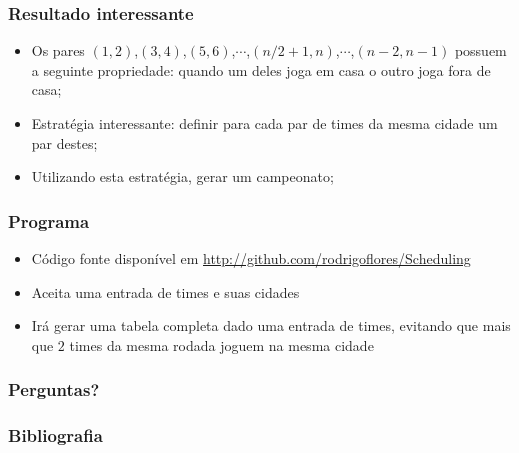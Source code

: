\documentclass{beamer}
\begin{document}
\begin{frame}
  \frametitle{Resultado interessante}
  \begin{itemize}
    \item Os pares $(1,2)$,$(3,4)$,$(5,6)$,$\cdots$,$(n/2+1,n)$,$\cdots$,$(n-2,n-1)$ possuem a seguinte propriedade: quando um deles joga em casa o outro joga
    fora de casa;
    \item Estratégia interessante: definir para cada par de times da mesma cidade um par destes;
    \item Utilizando esta estratégia, gerar um campeonato; 
  \end{itemize}
\end{frame}

\begin{frame}
  \frametitle{Programa}
  \begin{itemize}
    \item Código fonte disponível em \url{http://github.com/rodrigoflores/Scheduling}
    \item Aceita uma entrada de times e suas cidades
    \item Irá gerar uma tabela completa dado uma entrada de times, evitando que mais que $2$ times da mesma rodada joguem na mesma cidade
  \end{itemize}
\end{frame}

\begin{frame}
  \frametitle{Perguntas?}
\end{frame}

\begin{frame}
  \frametitle{Bibliografia}
  
  
\end{frame}
\end{document}
